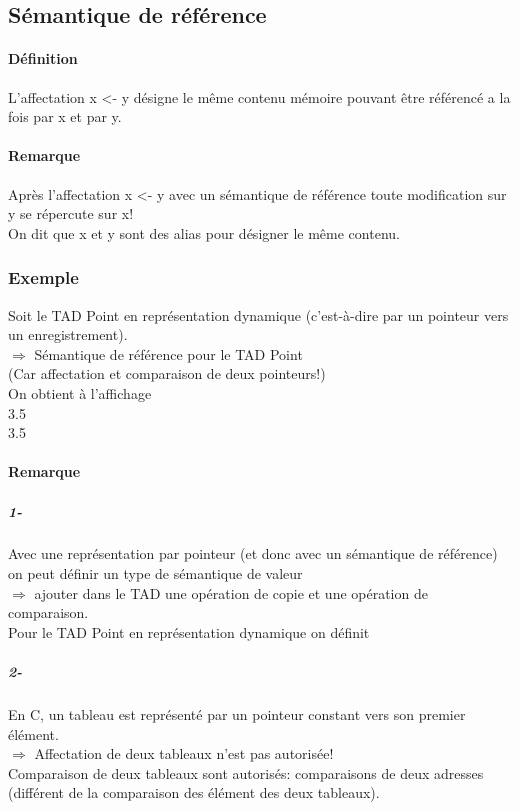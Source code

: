	\subsection{Sémantique de référence}
		\paragraph{Définition}
			L'affectation x <- y désigne le même contenu mémoire pouvant être référencé a la fois par x et 
			par y.
		\paragraph{Remarque}
			Après l'affectation x <- y avec un sémantique de référence toute modification sur y se 
			répercute sur x! \\
			On dit que x et y sont des alias pour désigner le même contenu.	

		\subsubsection{Exemple}
			Soit le TAD Point en représentation dynamique (c'est-à-dire par un pointeur vers un
			enregistrement).\\
			$\Rightarrow$ Sémantique de référence pour le TAD Point\\
			(Car affectation et comparaison de deux pointeurs!)\\
							
			
			
			On obtient à l'affichage\\ 3.5\\3.5	
			\paragraph{Remarque}
				\subparagraph{1- }
					Avec une représentation par pointeur (et donc avec un sémantique de référence) 
					on peut définir un type de sémantique de valeur\\
					$\Rightarrow$ ajouter dans le TAD une opération de copie et une opération de 
					comparaison.\\
					Pour le TAD Point en représentation dynamique on définit
					
				\subparagraph{2- }
					En C, un tableau est représenté par un pointeur constant vers son premier élément. 	\\
					$\Rightarrow$ Affectation de deux tableaux n'est pas autorisée!\\
					Comparaison de deux tableaux sont autorisés: comparaisons de deux adresses (différent
					de la comparaison des élément des deux tableaux).


